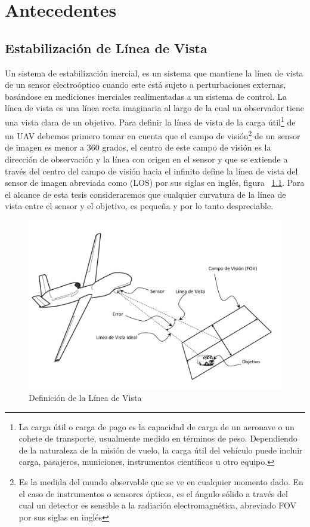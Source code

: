 

\chapter{Antecedentes}

\section{Estabilizaci\'{o}n de L\'{i}nea de Vista}
Un sistema de estabilizaci\'{o}n inercial, es un sistema que mantiene la l\'{i}nea de vista de un sensor electro\'{o}ptico cuando este est\'{a} sujeto a perturbaciones externas, bas\'{a}ndose en mediciones inerciales realimentadas a un sistema de control. La l\'{i}nea de vista es una l\'{i}nea recta imaginaria al largo de la cual un observador tiene una vista clara de un objetivo. Para definir la l\'{i}nea de vista de la carga \'{u}til\footnote{La carga \'{u}til o carga de pago es la capacidad de carga de un aeronave o un cohete de transporte, usualmente medido en t\'{e}rminos de peso. Dependiendo de la naturaleza de la misi\'{o}n de vuelo, la carga \'{u}til del veh\'{i}culo puede incluir carga, pasajeros, municiones, instrumentos cient\'{i}ficos u otro equipo.} de un UAV debemos primero tomar en cuenta que el campo de visi\'{o}n\footnote{Es la medida del mundo observable que se ve en cualquier momento dado. En el caso de instrumentos o sensores \'{o}pticos, es el \'{a}ngulo s\'{o}lido a trav\'{e}s del cual un detector es sensible a la radiaci\'{o}n electromagn\'{e}tica, abreviado FOV por sus siglas en ingl\'{e}s} de un sensor de imagen es menor a 360 grados, el centro de este campo de visi\'{o}n es la direcci\'{o}n de observaci\'{o}n y la l\'{i}nea con origen en el sensor y que se extiende a trav\'{e}s del centro del campo de visi\'{o}n hacia el infinito define la l\'{i}nea de vista del sensor de imagen abreviada como (LOS) por sus siglas en ingl\'{e}s, figura ~\ref{fig:LOSDef}. Para el alcance de esta tesis consideraremos que cualquier curvatura de la l\'{i}nea de vista entre el sensor y el objetivo, es peque\~{n}a y por lo tanto despreciable.

\begin{figure}[H]
\centering \includegraphics[scale=0.5]{img/LOSDef.pdf}
\caption{Definici\'{o}n de la L\'{i}nea de Vista}%
\label{fig:LOSDef}
\end{figure}

